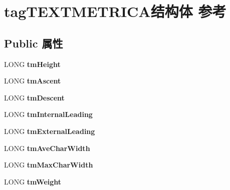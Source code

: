 \hypertarget{structtag_t_e_x_t_m_e_t_r_i_c_a}{}\section{tag\+T\+E\+X\+T\+M\+E\+T\+R\+I\+C\+A结构体 参考}
\label{structtag_t_e_x_t_m_e_t_r_i_c_a}
\subsection*{Public 属性}
\begin{DoxyCompactItemize}
\item 
\mbox{\label{structtag_t_e_x_t_m_e_t_r_i_c_a_ae04bc040d1e7d0412a93aa93e3ec2c2c}} 
L\+O\+NG {\bfseries tm\+Height}
\item 
\mbox{\label{structtag_t_e_x_t_m_e_t_r_i_c_a_ace3f1398d4d5ead275e2e79de3001017}} 
L\+O\+NG {\bfseries tm\+Ascent}
\item 
\mbox{\label{structtag_t_e_x_t_m_e_t_r_i_c_a_a5329dcdb82653a398e05b6f3bcdfeec0}} 
L\+O\+NG {\bfseries tm\+Descent}
\item 
\mbox{\label{structtag_t_e_x_t_m_e_t_r_i_c_a_a85d4684e4ff1252276bb94ac68e6aced}} 
L\+O\+NG {\bfseries tm\+Internal\+Leading}
\item 
\mbox{\label{structtag_t_e_x_t_m_e_t_r_i_c_a_a7109846a98c85f255eb93428684c52ad}} 
L\+O\+NG {\bfseries tm\+External\+Leading}
\item 
\mbox{\label{structtag_t_e_x_t_m_e_t_r_i_c_a_aab8a99c9cd6a09aafd6f0b5bf7a814e6}} 
L\+O\+NG {\bfseries tm\+Ave\+Char\+Width}
\item 
\mbox{\label{structtag_t_e_x_t_m_e_t_r_i_c_a_aa10944a2bbb5d5546ee3e1900557c590}} 
L\+O\+NG {\bfseries tm\+Max\+Char\+Width}
\item 
\mbox{\label{structtag_t_e_x_t_m_e_t_r_i_c_a_a80aa57e46a9e58d644bbc54ac9602622}} 
L\+O\+NG {\bfseries tm\+Weight}

\end{DoxyCompactItemize}
